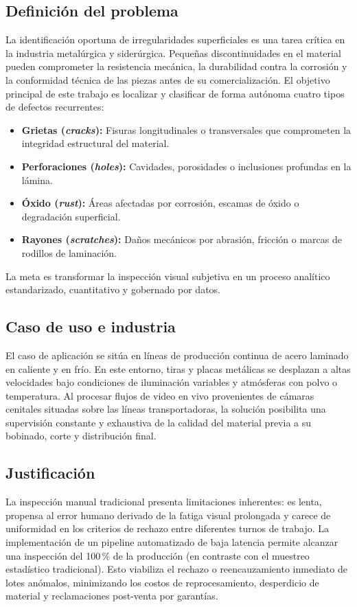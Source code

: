 \documentclass[11pt,a4paper]{article}
\begin{document}
\subsection{Definición del problema}
La identificación oportuna de irregularidades superficiales es una tarea crítica en
la industria metalúrgica y siderúrgica. Pequeñas discontinuidades en el material
pueden comprometer la resistencia mecánica, la durabilidad contra la corrosión y la
conformidad técnica de las piezas antes de su comercialización. El objetivo
principal de este trabajo es localizar y clasificar de forma autónoma cuatro tipos de
defectos recurrentes:
\begin{itemize}[leftmargin=1.6em,itemsep=0.1em]
  \item \textbf{Grietas (\emph{cracks}):} Fisuras longitudinales o transversales
  que comprometen la integridad estructural del material.
  \item \textbf{Perforaciones (\emph{holes}):} Cavidades, porosidades o inclusiones
  profundas en la lámina.
  \item \textbf{Óxido (\emph{rust}):} Áreas afectadas por corrosión, escamas de
  óxido o degradación superficial.
  \item \textbf{Rayones (\emph{scratches}):} Daños mecánicos por abrasión, fricción
  o marcas de rodillos de laminación.
\end{itemize}
La meta es transformar la inspección visual subjetiva en un proceso analítico
estandarizado, cuantitativo y gobernado por datos.

\subsection{Caso de uso e industria}
El caso de aplicación se sitúa en líneas de producción continua de acero laminado en
caliente y en frío. En este entorno, tiras y placas metálicas se desplazan a altas
velocidades bajo condiciones de iluminación variables y atmósferas con polvo o
temperatura. Al procesar flujos de video en vivo provenientes de cámaras cenitales
situadas sobre las líneas transportadoras, la solución posibilita una supervisión
constante y exhaustiva de la calidad del material previa a su bobinado, corte y
distribución final.

\subsection{Justificación}
La inspección manual tradicional presenta limitaciones inherentes: es lenta, propensa
al error humano derivado de la fatiga visual prolongada y carece de uniformidad en los
criterios de rechazo entre diferentes turnos de trabajo. La implementación de un
pipeline automatizado de baja latencia permite alcanzar una inspección del 100\,\% de
la producción (en contraste con el muestreo estadístico tradicional). Esto viabiliza
el rechazo o reencauzamiento inmediato de lotes anómalos, minimizando los costos de
reprocesamiento, desperdicio de material y reclamaciones post-venta por garantías.
\end{document}

